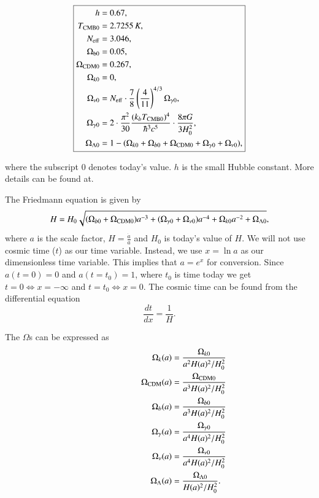 \documentclass{aa}
\begin{document}
\begin{equation}
      \boxed{
   \begin{aligned}
      h &= 0.67, \\
      T_{\rm CMB 0} &= 2.7255\,K, \\
      N_{\rm eff} &= 3.046, \\
      \Omega_{\rm b 0} &= 0.05, \\
      \Omega_{\rm CDM 0} &= 0.267,\\
      \Omega_{k 0} &= 0, \\
      \Omega_{\nu 0} &= N_{\rm eff}\cdot \frac{7}{8}\left(\frac{4}{11}\right)^{4/3}\Omega_{\gamma 0}, \\
      \Omega_{\gamma 0} &= 2\cdot \frac{\pi^2}{30} \frac{(k_bT_{\rm CMB 0})^4}{\hbar^3 c^5} \cdot \frac{8\pi G}{3H_0^2},\\
      \Omega_{\Lambda 0} &= 1 - (\Omega_{k 0}+\Omega_{b 0}+\Omega_{\rm CDM 0}+\Omega_{\gamma 0}+\Omega_{\nu 0}),
   \end{aligned}}
\end{equation}

where the subscript 0 denotes today's value. $h$ is the small Hubble constant. More details can be found at.%

The Friedmann equation is given by
\begin{equation}\label{Friedmann}
      H = H_0 \sqrt{(\Omega_{b0}+\Omega_{\rm CDM 0})a^{-3} + (\Omega_{\gamma 0} + \Omega_{\nu 0}) a^{-4} + \Omega_{k 0} a^{-2} + \Omega_{\Lambda 0}},
\end{equation}
where $a$ is the scale factor, $H = \frac{\dot{a}}{a}$ and $H_0$ is today's value of $H$. We will not use cosmic time ($t$) as our time variable.
Instead, we use $x=\ln a$ as our dimensionless time variable. This implies that $a = e^x$ for conversion. Since $a(t=0) =0$ and $a(t=t_0) = 1$, where $t_0$ is time today
we get $t=0 \iff x = -\infty$ and $t=t_0 \iff x = 0$. The cosmic time can be found from the differential equation 
\begin{equation}\label{cosmic_time_differential_equation}
      \frac{dt}{dx} = \frac{1}{H}.
\end{equation}


The $\Omega$s can be expressed as
\begin{equation}
      \hspace*{2cm}
   \begin{aligned}
      \Omega_{k}(a) &= \frac{\Omega_{k0}}{a^2H(a)^2/H_0^2}\\
      \Omega_{\rm CDM}(a) &= \frac{\Omega_{\rm CDM 0}}{a^3H(a)^2/H_0^2} \\
      \Omega_b(a) &= \frac{\Omega_{b 0}}{a^3H(a)^2/H_0^2} \\
      \Omega_\gamma(a) &= \frac{\Omega_{\gamma 0}}{a^4H(a)^2/H_0^2} \\
      \Omega_{\nu}(a) &= \frac{\Omega_{\nu 0}}{a^4H(a)^2/H_0^2} \\
      \Omega_{\Lambda}(a) &= \frac{\Omega_{\Lambda 0}}{H(a)^2/H_0^2}.
   \end{aligned}
\end{equation}
\end{document}
